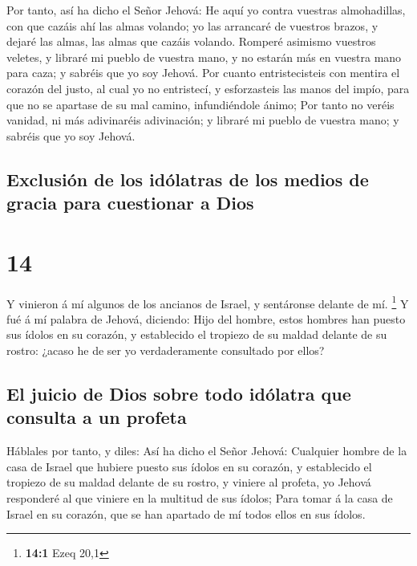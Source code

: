  Por tanto, así ha dicho el Señor Jehová: He aquí yo contra
vuestras almohadillas, con que cazáis ahí las almas volando; yo las
arrancaré de vuestros brazos, y dejaré las almas, las almas que cazáis
volando.  Romperé asimismo vuestros veletes, y libraré mi
pueblo de vuestra mano, y no estarán más en vuestra mano para caza; y
sabréis que yo soy Jehová.  Por cuanto entristecisteis con
mentira el corazón del justo, al cual yo no entristecí, y esforzasteis
las manos del impío, para que no se apartase de su mal camino,
infundiéndole ánimo;  Por tanto no veréis vanidad, ni más
adivinaréis adivinación; y libraré mi pueblo de vuestra mano; y sabréis
que yo soy Jehová.

\hypertarget{exclusiuxf3n-de-los-iduxf3latras-de-los-medios-de-gracia-para-cuestionar-a-dios}{%
\subsection{Exclusión de los idólatras de los medios de gracia para
cuestionar a
Dios}\label{exclusiuxf3n-de-los-iduxf3latras-de-los-medios-de-gracia-para-cuestionar-a-dios}}

\hypertarget{section-13}{%
\section{14}\label{section-13}}

 Y vinieron á mí algunos de los ancianos de Israel, y
sentáronse delante de mí. \footnote{\textbf{14:1} Ezeq 20,1}
 Y fué á mí palabra de Jehová, diciendo:  Hijo
del hombre, estos hombres han puesto sus ídolos en su corazón, y
establecido el tropiezo de su maldad delante de su rostro: ¿acaso he de
ser yo verdaderamente consultado por ellos?

\hypertarget{el-juicio-de-dios-sobre-todo-iduxf3latra-que-consulta-a-un-profeta}{%
\subsection{El juicio de Dios sobre todo idólatra que consulta a un
profeta}\label{el-juicio-de-dios-sobre-todo-iduxf3latra-que-consulta-a-un-profeta}}

 Háblales por tanto, y diles: Así ha dicho el Señor Jehová:
Cualquier hombre de la casa de Israel que hubiere puesto sus ídolos en
su corazón, y establecido el tropiezo de su maldad delante de su rostro,
y viniere al profeta, yo Jehová responderé al que viniere en la multitud
de sus ídolos;  Para tomar á la casa de Israel en su
corazón, que se han apartado de mí todos ellos en sus ídolos.

